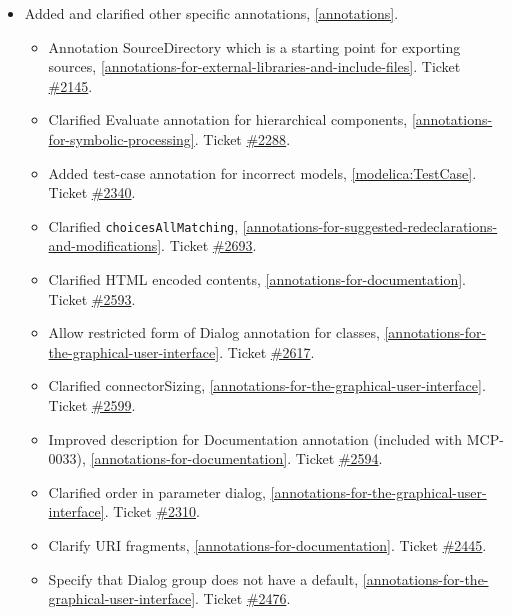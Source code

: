 \begin{itemize}
\item Added and clarified other specific annotations, \cref{annotations}.
\begin{itemize}
\item Annotation SourceDirectory which is a starting point for exporting sources, \cref{annotations-for-external-libraries-and-include-files}.
Ticket \href{https://github.com/modelica/ModelicaSpecification/issues/2145}{\#2145}.
\item Clarified Evaluate annotation for hierarchical components, \cref{annotations-for-symbolic-processing}.
Ticket \href{https://github.com/modelica/ModelicaSpecification/issues/2288}{\#2288}.
\item Added test-case annotation for incorrect models, \cref{modelica:TestCase}.
Ticket \href{https://github.com/modelica/ModelicaSpecification/issues/2340}{\#2340}.
\item Clarified \lstinline!choicesAllMatching!, \cref{annotations-for-suggested-redeclarations-and-modifications}.
Ticket \href{https://github.com/modelica/ModelicaSpecification/issues/2693}{\#2693}.
\item Clarified HTML encoded contents, \cref{annotations-for-documentation}.
Ticket \href{https://github.com/modelica/ModelicaSpecification/pull/2593}{\#2593}.
\item Allow restricted form of Dialog annotation for classes, \cref{annotations-for-the-graphical-user-interface}.
Ticket \href{https://github.com/modelica/ModelicaSpecification/issues/2617}{\#2617}.
\item Clarified connectorSizing, \cref{annotations-for-the-graphical-user-interface}.
Ticket \href{https://github.com/modelica/ModelicaSpecification/pull/2599}{\#2599}.
\item Improved description for Documentation annotation (included with MCP-0033), \cref{annotations-for-documentation}.
Ticket \href{https://github.com/modelica/ModelicaSpecification/pull/2594}{\#2594}.
\item Clarified order in parameter dialog, \cref{annotations-for-the-graphical-user-interface}.
Ticket \href{https://github.com/modelica/ModelicaSpecification/issues/2310}{\#2310}.
\item Clarify URI fragments, \cref{annotations-for-documentation}.
Ticket \href{https://github.com/modelica/ModelicaSpecification/issues/2445}{\#2445}.
\item Specify that Dialog group does not have a default, \cref{annotations-for-the-graphical-user-interface}.
Ticket \href{https://github.com/modelica/ModelicaSpecification/issues/2476}{\#2476}.

\end{itemize}
\end{itemize}
